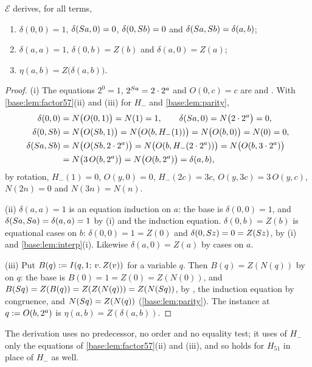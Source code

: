 \begin{lemma}
\label{base:lem:orbiteq}
$\mathcal E$ derives, for all terms,
\begin{enumerate}[label=\textup{(\roman*)}]
\item $\delta(0,0)=1$, $\delta(S a,0)=0$, $\delta(0,S b)=0$ and
 $\delta(S a,S b)=\delta(a,b)$;
\item $\delta(a,a)=1$, $\delta(0,b)=Z(b)$ and $\delta(a,0)=Z(a)$;
\item $\eta(a,b)=Z\bigl(\delta(a,b)\bigr)$.
\end{enumerate}
\end{lemma}

\begin{proof}
(i) The equations $2^{0}=1$, $2^{S a}=2\cdot 2^{a}$ and $O(0,c)=c$ are
 and .  With \cref{base:lem:factor57}(ii) and (iii)
for $H_-$ and \cref{base:lem:parity},
\begin{align*}
 \delta(0,0)&=N\bigl(O(0,1)\bigr)=N(1)=1,\qquad
 \delta(S a,0)=N\bigl(2\cdot 2^{a}\bigr)=0,\\
 \delta(0,S b)&=N\bigl(O(S b,1)\bigr)=N\bigl(O(b,H_-(1))\bigr)
  =N\bigl(O(b,0)\bigr)=N(0)=0,\\
 \delta(S a,S b)&=N\bigl(O(S b,2\cdot 2^{a})\bigr)
  =N\bigl(O(b,H_-(2\cdot 2^{a}))\bigr)=N\bigl(O(b,3\cdot 2^{a})\bigr)\\
 &=N\bigl(3\,O(b,2^{a})\bigr)=N\bigl(O(b,2^{a})\bigr)=\delta(a,b),
\end{align*}
by rotation, $H_-(1)=0$, $O(y,0)=0$, $H_-(2c)=3c$, $O(y,3c)=3\,O(y,c)$,
$N(2n)=0$ and $N(3n)=N(n)$.

(ii) $\delta(a,a)=1$ is an equation induction on $a$: the base is
$\delta(0,0)=1$, and $\delta(S a,S a)=\delta(a,a)=1$ by (i) and the
induction equation.  $\delta(0,b)=Z(b)$ is equational cases on $b$:
$\delta(0,0)=1=Z(0)$ and $\delta(0,S z)=0=Z(S z)$, by (i) and
\cref{base:lem:interp}(i).  Likewise $\delta(a,0)=Z(a)$ by cases on $a$.

(iii) Put $B(q)\mathrel{:=}I(q,1;\,v.\,Z(v))$ for a variable $q$.  Then
$B(q)=Z(N(q))$ by  on $q$: the base is $B(0)=1=Z(0)=Z(N(0))$,
and $B(S q)=Z(B(q))=Z(Z(N(q)))=Z(N(S q))$, by , the
induction equation by congruence, and $N(S q)=Z(N(q))$
(\cref{base:lem:parity}).  The instance at $q\mathrel{:=} O(b,2^{a})$ is
$\eta(a,b)=Z(\delta(a,b))$.
\end{proof}

The derivation uses no predecessor, no order and no equality test; it uses
of $H_-$ only the equations of \cref{base:lem:factor57}(ii) and (iii), and so
holds for $H_{51}$ in place of $H_-$ as well.

